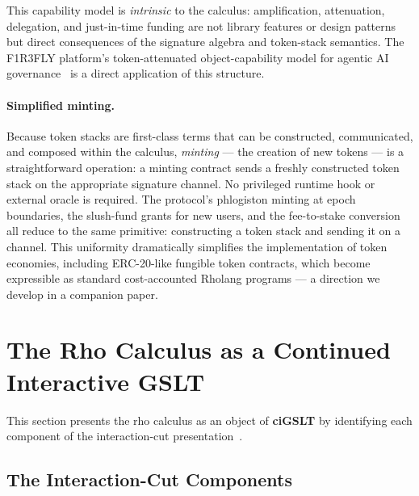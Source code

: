 \documentclass[11pt,a4paper]{article}
\begin{document}
\noindent
This capability model is \emph{intrinsic} to the calculus:
amplification, attenuation, delegation, and just-in-time
funding are not library features or design patterns but
direct consequences of the signature algebra and token-stack
semantics.  The F1R3FLY platform's token-attenuated
object-capability model for agentic AI
governance~\cite{VACRADA} is a direct application of this
structure.

\paragraph{Simplified minting.}
Because token stacks are first-class terms that can be
constructed, communicated, and composed within the calculus,
\emph{minting} --- the creation of new tokens --- is a
straightforward operation: a minting contract sends a
freshly constructed token stack on the appropriate signature
channel.  No privileged runtime hook or external oracle is
required.  The protocol's phlogiston minting at epoch
boundaries, the slush-fund grants for new users, and the
fee-to-stake conversion all reduce to the same primitive:
constructing a token stack and sending it on a channel.
This uniformity dramatically simplifies the implementation
of token economies, including ERC-20-like fungible token
contracts, which become expressible as standard
cost-accounted Rholang programs --- a direction we develop
in a companion paper.

\section{The Rho Calculus as a Continued Interactive GSLT}
\label{sec:instantiation}

This section presents the rho calculus as an object of
\textbf{ciGSLT} by identifying each component of the
interaction-cut presentation~\cite{CostEndofunctor}.

\subsection{The Interaction-Cut Components}
\label{sec:cut-components}
\end{document}
